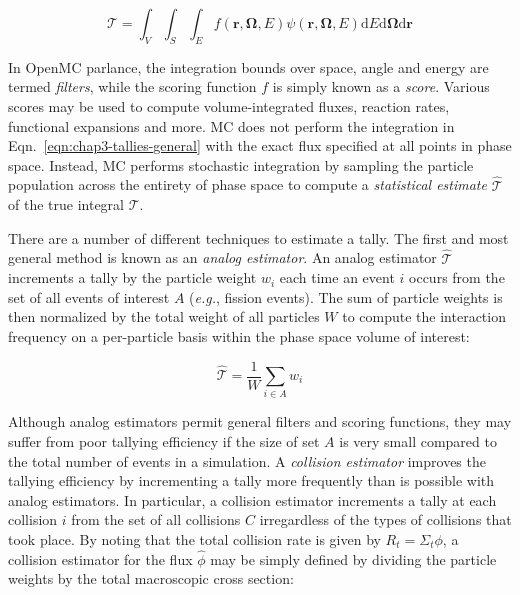 \begin{dmath}
\label{eqn:chap3-tallies-general}
\mathcal{T} = \int_{V} \int_{S} \int_{E}  f(\mathbf{r},\mathbf{\Omega},E)\psi(\mathbf{r},\mathbf{\Omega},E)\mathrm{d}E\mathrm{d}\mathbf{\Omega}\mathrm{d}\mathbf{r} 
\end{dmath}

In OpenMC parlance, the integration bounds over space, angle and energy are termed \textit{filters}, while the scoring function $f$ is simply known as a \textit{score}. Various scores may be used to compute volume-integrated fluxes, reaction rates, functional expansions and more. \ac{MC} does not perform the integration in Eqn.~\ref{eqn:chap3-tallies-general} with the exact flux specified at all points in phase space. Instead, \ac{MC} performs stochastic integration by sampling the particle population across the entirety of phase space to compute a \textit{statistical estimate} $\hat{\mathcal{T}}$ of the true integral $\mathcal{T}$.

There are a number of different techniques to estimate a tally. The first and most general method is known as an \textit{analog estimator}. An analog estimator $\hat{\mathcal{T}}$ increments a tally by the particle weight $w_{i}$ each time an event $i$ occurs from the set of all events of interest $A$ (\textit{e.g.}, fission events). The sum of particle weights is then normalized by the total weight of all particles $W$ to compute the interaction frequency on a per-particle basis within the phase space volume of interest:

\begin{dmath}
\label{eqn:chap3-tallies-analog}
\hat{\mathcal{T}} = \frac{1}{W}\displaystyle\sum\limits_{i \in A} w_{i}
\end{dmath}

Although analog estimators permit general filters and scoring functions, they may suffer from poor tallying efficiency if the size of set $A$ is very small compared to the total number of events in a simulation. A \textit{collision estimator} improves the tallying efficiency by incrementing a tally more frequently than is possible with analog estimators. In particular, a collision estimator increments a tally at each collision $i$ from the set of all collisions $C$ irregardless of the types of collisions that took place. By noting that the total collision rate is given by $R_{t} = \Sigma_{t}\phi$, a collision estimator for the flux $\hat{\phi}$ may be simply defined by dividing the particle weights by the total macroscopic cross section:

